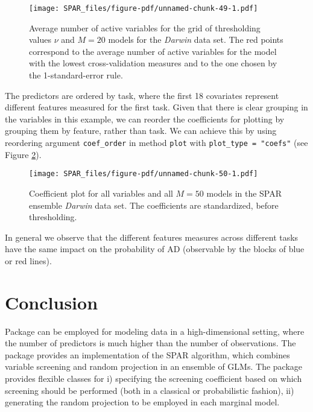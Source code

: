 \documentclass[
  article]{jss}
\begin{document}
\begin{figure}[H]

{\centering \texttt{[image: SPAR\_files/figure-pdf/unnamed-chunk-49-1.pdf]}

}

\caption{Average number of active variables for the grid of thresholding
values \(\nu\) and \(M=20\) models for the \emph{Darwin} data set. The
red points correspond to the average number of active variables for the
model with the lowest cross-validation measures and to the one chosen by
the 1-standard-error rule. \label{fig:darwin_activevars}}

\end{figure}%

The predictors are ordered by task, where the first 18 covariates
represent different features measured for the first task. Given that
there is clear grouping in the variables in this example, we can reorder
the coefficients for plotting by grouping them by feature, rather than
task. We can achieve this by using reordering argument
\texttt{coef\_order} in method \texttt{plot} with
\texttt{plot\_type\ =\ "coefs"} (see Figure \ref{fig:darwin_coefs}).

\begin{figure}[H]

{\centering \texttt{[image: SPAR\_files/figure-pdf/unnamed-chunk-50-1.pdf]}

}

\caption{Coefficient plot for all variables and all \(M=50\) models in
the SPAR ensemble \emph{Darwin} data set. The coefficients are
standardized, before thresholding. \label{fig:darwin_coefs}}

\end{figure}%

In general we observe that the different features measures across
different tasks have the same impact on the probability of AD
(observable by the blocks of blue or red lines).

\section{Conclusion}\label{sec-conclusion}

Package  can be employed for modeling data in a
high-dimensional setting, where the number of predictors is much higher
than the number of observations. The package provides an implementation
of the SPAR algorithm, which combines variable screening and random
projection in an ensemble of GLMs. The package provides flexible classes
for i) specifying the screening coefficient based on which screening
should be performed (both in a classical or probabilistic fashion), ii)
generating the random projection to be employed in each marginal model.
\end{document}

